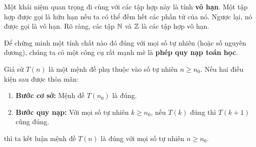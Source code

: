 Một khái niệm quan trọng đi cùng với các tập hợp này là tính \textbf{vô hạn}. Một tập hợp được gọi là hữu hạn nếu ta có thể đếm hết các phần tử của nó. Ngược lại, nó được gọi là vô hạn. Rõ ràng, các tập $\mathbb{N}$ và $\mathbb{Z}$ là các tập hợp vô hạn.

Để chứng minh một tính chất nào đó đúng với mọi số tự nhiên (hoặc số nguyên dương), chúng ta có một công cụ rất mạnh mẽ là \textbf{phép quy nạp toán học}.

\begin{proposition}
    Giả sử $T(n)$ là một mệnh đề phụ thuộc vào số tự nhiên $n \ge n_0$. Nếu hai điều kiện sau được thỏa mãn:
    \begin{enumerate}
        \item \textbf{Bước cơ sở:} Mệnh đề $T(n_0)$ là đúng.
        \item \textbf{Bước quy nạp:} Với mọi số tự nhiên $k \ge n_0$, nếu $T(k)$ đúng thì $T(k+1)$ cũng đúng.
    \end{enumerate}
    thì ta kết luận mệnh đề $T(n)$ là đúng với mọi số tự nhiên $n \ge n_0$.
\end{proposition}

